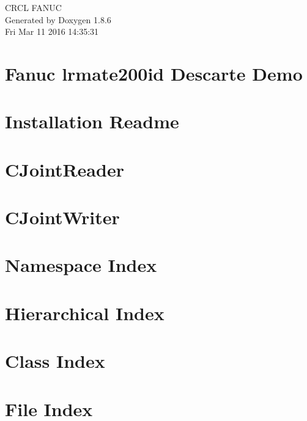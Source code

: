 \documentclass[twoside]{book}
\newcommand{\clearemptydoublepage}{%
  \newpage{\pagestyle{empty}\cleardoublepage}%
}
\begin{document}
\hypersetup{pageanchor=false}
\begin{titlepage}
\vspace*{7cm}
\begin{center}%
{\Large C\-R\-C\-L F\-A\-N\-U\-C }\\
\vspace*{1cm}
{\large Generated by Doxygen 1.8.6}\\
\vspace*{0.5cm}
{\small Fri Mar 11 2016 14:35:31}\\
\end{center}
\end{titlepage}
\clearemptydoublepage
\tableofcontents
\clearemptydoublepage
{}
\hypersetup{pageanchor=true}

\chapter{Fanuc lrmate200id Descarte Demo}
\label{md_Readme}
\hypertarget{md_Readme}{}

\chapter{Installation Readme}
\label{md_Installation}
\hypertarget{md_Installation}{}

\chapter{C\-Joint\-Reader}
\label{md_JointReader}
\hypertarget{md_JointReader}{}

\chapter{C\-Joint\-Writer}
\label{md_JointWriter}
\hypertarget{md_JointWriter}{}

\chapter{Namespace Index}

\chapter{Hierarchical Index}

\chapter{Class Index}

\chapter{File Index}

\end{document}
